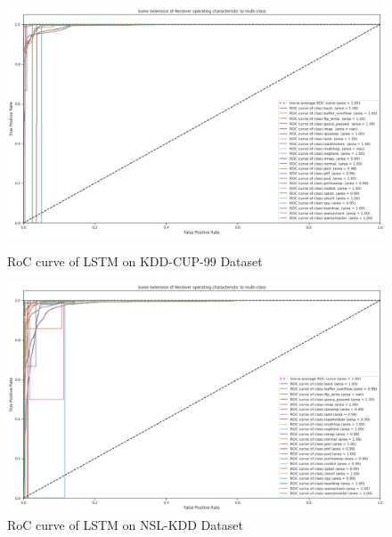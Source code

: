 \documentclass[conference]{IEEEtran}
\begin{document}
\clearpage
\begin{figure}[h]
  \centering
  \includegraphics[width=18cm]{LSTM_KDD.png}
  \caption{RoC curve of LSTM on KDD-CUP-99 Dataset}
  \label{LSTM_KDD}
  \vspace*{\floatsep}%

  \includegraphics[width=18cm]{LSTM_NSL.png}
  \caption{RoC curve of LSTM on NSL-KDD Dataset}
  \label{LSTM_NSL}
  
\end{figure}


\end{document}
